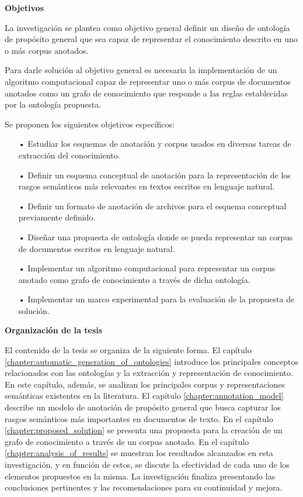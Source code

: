 \noindent\textbf{\large Objetivos}

La investigación se plantea como objetivo general definir un diseño de ontología de propósito general que sea capaz de representar el conocimiento descrito en uno o más corpus anotados.

Para darle solución al objetivo general es necesaria la implementación de un algoritmo computacional capaz de representar uno o más corpus de documentos anotados como un grafo de conocimiento que responde a las reglas establecidas por la ontología propuesta.

Se proponen los siguientes objetivos específicos:
\begin{itemize}
	\vspace{-0.27cm}
	\item[•] Estudiar los esquemas de anotación y corpus usados en diversas tareas de extracción del conocimiento.
	\vspace{-0.27cm}
	\item[•] Definir un esquema conceptual de anotación para la representación de los rasgos semánticos más relevantes en textos escritos en lenguaje natural.
	\vspace{-0.27cm}
	\item[•] Definir un formato de anotación de archivos para el esquema conceptual previamente definido.
	\vspace{-0.27cm}
	\item[•] Diseñar una propuesta de ontología donde se pueda representar un corpus de documentos escritos en lenguaje natural.
	\vspace{-0.27cm}
	\item[•] Implementar un algoritmo computacional para representar un corpus anotado como grafo de conocimiento a través de dicha ontología.
	\vspace{-0.27cm}
	\item[•] Implementar un marco experimental para la evaluación de la propuesta de solución.
\end{itemize}

\noindent\textbf{\large Organización de la tesis}

El contenido de la tesis se organiza de la siguiente forma. El capítulo \ref{chapter:automatic_generation_of_ontologies} introduce los principales conceptos relacionados con las ontologías y la extracción y representación de conocimiento. En este capítulo, además, se analizan los principales corpus y representaciones semánticas existentes en la literatura. El capítulo \ref{chapter:annotation_model} describe un modelo de anotación de propósito general que busca capturar los rasgos semánticos más importantes en documentos de texto. En el capítulo \ref{chapter:proposed_solution} se presenta una propuesta para la creación de un grafo de conocimiento a través de un corpus anotado. En el capítulo \ref{chapter:analysis_of_results} se muestran los resultados alcanzados en esta investigación, y en función de estos, se discute la efectividad de cada uno de los elementos propuestos en la misma. La investigación finaliza presentando las conclusiones pertinentes y las recomendaciones para su continuidad y mejora.